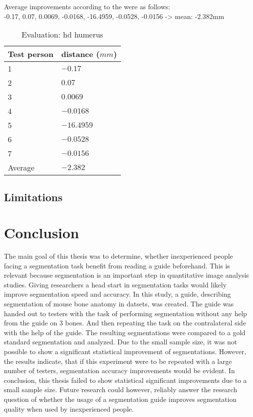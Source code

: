 \noindent
Average improvements according to the  were as follows:\\
-0.17, 0.07, 0.0069, -0.0168, -16.4959, -0.0528, -0.0156 -> mean: -2.382mm
\begin{table}[ht]
	\begin{center}
		\begin{tabular}{l l}
			\textbf{Test person} & \textbf{distance ($mm$)} \\
			\hline
			1                    & $-0.17$                  \\
			2                    & $0.07$                   \\
			3                    & $0.0069$                 \\
			4                    & $-0.0168$                \\
			5                    & $-16.4959$               \\
			6                    & $-0.0528$                \\
			7                    & $-0.0156$                \\
			\hline
			Average              & $-2.382$                 \\
		\end{tabular}
		\caption{Evaluation: \acrshort{hd} humerus}\label{tab:humerus-distance}
	\end{center}
\end{table}



\section{Limitations}\label{c:limitations}

\chapter{Conclusion}\label{c:conclusion}
The main goal of this thesis was to determine, whether inexperienced people facing a \mct\space segmentation task benefit from reading a guide beforehand.
This is relevant because segmentation is an important step in quantitative image analysis studies.
Giving researchers a head start in segmentation tasks would likely improve segmentation speed and accuracy.
In this study, a guide, describing segmentation of mouse bone anatomy in \mct\space datsets, was created.
The guide was handed out to testers with the task of performing segmentation without any help from the guide on 3 bones.
And then repeating the task on the contralateral side with the help of the guide.
The resulting segmentations were compared to a gold standard segmentation and analyzed.
Due to the small sample size, it was not possible to show a significant statistical improvement of segmentations.
However, the results indicate, that if this experiment were to be repeated with a large number of testers, segmentation accuracy improvements would be evident.
In conclusion, this thesis failed to show statistical significant improvements due to a small sample size.
Future research could however, reliably answer the research question of whether the usage of a segmentation guide improves segmentation quality when used by inexperienced people.


